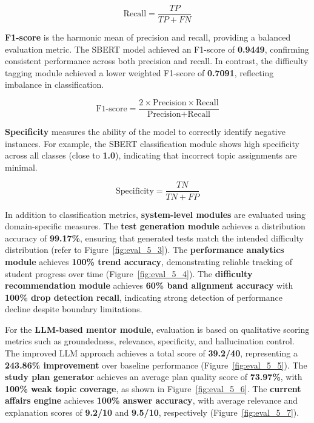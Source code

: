 \begin{sloppypar}
\begin{equation}
\text{Recall} = \frac{TP}{TP + FN} \tag{5.3}
\end{equation}

\textbf{F1-score} is the harmonic mean of precision and recall, providing a balanced evaluation metric. The SBERT model achieved an F1-score of \textbf{0.9449}, confirming consistent performance across both precision and recall. In contrast, the difficulty tagging module achieved a lower weighted F1-score of \textbf{0.7091}, reflecting imbalance in classification.

\begin{equation}
\text{F1-score} = \frac{2 \times \text{Precision} \times \text{Recall}}{\text{Precision} + \text{Recall}} \tag{5.4}
\end{equation}

\textbf{Specificity} measures the ability of the model to correctly identify negative instances. For example, the SBERT classification module shows high specificity across all classes (close to \textbf{1.0}), indicating that incorrect topic assignments are minimal.

\begin{equation}
\text{Specificity} = \frac{TN}{TN + FP} \tag{5.5}
\end{equation}

In addition to classification metrics, \textbf{system-level modules} are evaluated using domain-specific measures. The \textbf{test generation module} achieves a distribution accuracy of \textbf{99.17\%}, ensuring that generated tests match the intended difficulty distribution (refer to Figure~\ref{fig:eval_5_3}). The \textbf{performance analytics module} achieves \textbf{100\% trend accuracy}, demonstrating reliable tracking of student progress over time (Figure~\ref{fig:eval_5_4}). The \textbf{difficulty recommendation module} achieves \textbf{60\% band alignment accuracy} with \textbf{100\% drop detection recall}, indicating strong detection of performance decline despite boundary limitations.

For the \textbf{LLM-based mentor module}, evaluation is based on qualitative scoring metrics such as groundedness, relevance, specificity, and hallucination control. The improved LLM approach achieves a total score of \textbf{39.2/40}, representing a \textbf{243.86\% improvement} over baseline performance (Figure~\ref{fig:eval_5_5}). The \textbf{study plan generator} achieves an average plan quality score of \textbf{73.97\%}, with \textbf{100\% weak topic coverage}, as shown in Figure~\ref{fig:eval_5_6}. The \textbf{current affairs engine} achieves \textbf{100\% answer accuracy}, with average relevance and explanation scores of \textbf{9.2/10} and \textbf{9.5/10}, respectively (Figure~\ref{fig:eval_5_7}).


\end{sloppypar}
